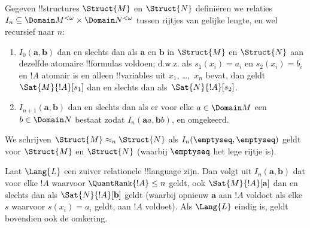 \documentclass[openany]{memoir}
\begin{document}
\begin{defn}
  Gegeven !!{structure}s $\Struct{M}$ en $\Struct{N}$ definiëren we
  relaties $I_n \subseteq \Domain M^{<\omega} \times \Domain N^{<\omega}$
  tussen rijtjes van gelijke lengte, en wel recursief naar $n$:
   \begin{enumerate}
   \item $I_0(\mathbf{a},\mathbf{b})$ dan en slechts dan als
     $\mathbf{a}$ en $\mathbf{b}$ in $\Struct{M}$ en $\Struct{N}$
     aan dezelfde atomaire !!{formula}s voldoen; d.w.z. als
     $s_1(x_i) = a_i$ en $s_2(x_i) = b_i$ en $!A$ atomair is en alleen
     !!{variable}s uit $x_1$, \dots,~$x_n$ bevat, dan geldt
     $\Sat{M}{!A}[s_1]$ dan en slechts dan als~$\Sat{N}{!A}[s_2]$.
   \item $I_{n+1} (\mathbf{a},\mathbf{b})$ dan en slechts dan als er
     voor elke $a\in \Domain M$ een $b\in \Domain N$ bestaat zodat
     $I_n(\mathbf{a}a,\mathbf{b}b)$, en omgekeerd.
   \end{enumerate}
\end{defn}


\begin{defn}
  We schrijven $\Struct{M} \approx_n \Struct{N}$ als
  $I_n(\emptyseq,\emptyseq)$ geldt voor $\Struct{M}$ en
  $\Struct{N}$ (waarbij $\emptyseq$ het lege rijtje is).
\end{defn}

\begin{thm}
  Laat $\Lang{L}$ een zuiver relationele !!{language} zijn. Dan volgt
  uit $I_n(\mathbf{a},\mathbf{b})$ dat voor elke $!A$ waarvoor
  $\QuantRank{!A} \le n$ geldt, ook $\Sat{M}{!A}[\mathbf{a}]$ dan en
  slechts dan als $\Sat{N}{!A}[\mathbf{b}]$ geldt (waarbij opnieuw
  $\mathbf{a}$ aan $!A$ voldoet als elke $s$ waarvoor
  $s(x_i) = a_i$ geldt, aan $!A$ voldoet). Als $\Lang{L}$ eindig is,
  geldt bovendien ook de omkering.
\end{thm}
\end{document}
